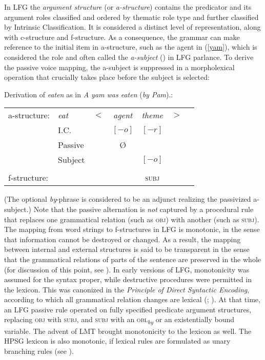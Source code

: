 In LFG the \textit{argument structure} (or \textit{a-structure}) contains the predicator and its argument roles classified and ordered by thematic role type and further classified by  Intrinsic Classification.  It is considered a distinct level of representation, along with c-structure and f-structure.  As a consequence, the grammar can make reference to the initial item in a-structure, such as the agent
in (\ref{yam}), which is considered the  role and often called the \textit{a-subject} () in LFG parlance.  To derive the passive voice mapping, the a-subject is suppressed in a morpholexical operation that crucially takes place before the subject is selected:  

\begin{exe}
\ex\label{yam2}{Derivation of \textit{eaten} as in \emph{A yam was eaten} (\emph{by Pam}).:\\
\begin{tabular}[t]{@{}lllccll}
a-structure: &\textit{eat}& $<$& \textit{agent} & \textit{theme}   & $>$ & \\
             & I.C.      &    & $[-o]$ & $[-r]$   &   & \\
             & Passive      &    & \O  &    &   & \\
             &  Subject     &    &  &       $[-o]$     &              & \\
             &       &    &    & \vline &    & \\
f-structure: &       &    & &\textsc{subj} &   &
\end{tabular}
  }
\end{exe}
(The optional \textit{by}-phrase is considered to be an adjunct realizing the passivized a-subject.)  Note that the passive alternation is \textit{not} captured by a procedural rule that replaces one grammatical relation (such as \textsc{obj}) with another (such as \textsc{subj}).   The mapping from word strings to f-structures in LFG is monotonic, in the sense that information cannot be destroyed or changed.  As a result, the mapping between internal and external structures is said to be transparent in the sense that the grammatical relations of parts of the sentence are preserved in the whole (for discussion of this point, see \citealt[Chapter 5]{BATW2016a}).  In early versions of LFG, monotonicity was assumed for the syntax proper, while destructive procedures were permitted in the lexicon.  This was canonized in the \textit{Principle of Direct Syntactic Encoding}, according to which all grammatical relation changes are lexical (\citealt[180]{KB82a-u}; \citealt[77]{BATW2016a}).  At that time, an LFG passive rule operated on fully specified predicate argument structures, replacing \textsc{obj} with \textsc{subj}, and \textsc{subj} with an \textsc{obl}\textsubscript{\emph{by}} or an existentially bound variable.  The advent of LMT brought monotonicity to the lexicon as well.  The HPSG lexicon is also monotonic, if lexical rules are formulated as unary branching rules (see ). 


